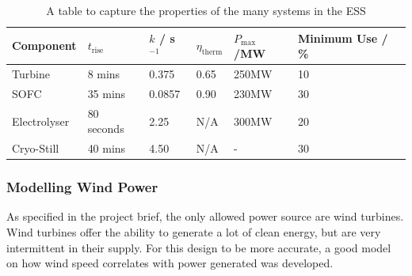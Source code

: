%
    \begin{table}[ht]
            \centering
        \begin{tabular}{||l l l l l l||}
                \hline
                Component & $t_{\text{rise}}$ & $k$ / s$^{-1}$ & $\eta_{\text{therm}}$ & $P_{\text{max}}$/MW& Minimum Use / \%\\
                \hline
                \hline
                Turbine& 8 mins & 0.375 & 0.65 & 250MW & 10\\
                \hline
                SOFC& 35 mins & 0.0857 & 0.90 & 230MW & 30\\
                \hline
                Electrolyser& 80 seconds & 2.25 & N/A & 300MW & 20\\
                \hline
                Cryo-Still & 40 mins & 4.50 & N/A & - & 30\\
                \hline
        \end{tabular}
        \caption{A table to capture the properties of the many systems in the ESS}
                \label{tbl:time}
    \end{table}

\subsubsection{Modelling Wind Power}

As specified in the project brief, the only allowed power source are wind turbines.
Wind turbines offer the ability to generate a lot of clean energy, but are very intermittent in their supply.
For this design to be more accurate, a good model on how wind speed correlates with power generated was developed.

